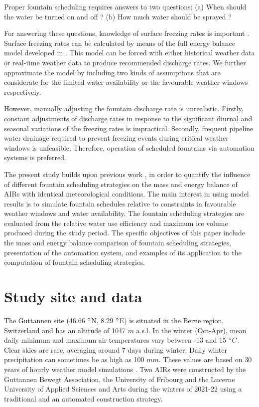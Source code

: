 \documentclass[tc, manuscript]{copernicus}
\begin{document}
Proper fountain scheduling requires answers to two questions: 
(a) When should the water be turned on and off ?
(b) How much water should be sprayed ? 

For answering these questions, knowledge of surface freezing rates is important . Surface freezing rates can be
calculated by means of the full energy balance model developed in
\cite{balasubramanianInfluenceMeteorologicalConditions2022}. This model can be forced with either historical
weather data or real-time weather data to produce recommended discharge rates. We further approximate the model
by including two kinds of assumptions that are considerate for the limited water availability or the favourable
weather windows respectively.

However, manually adjusting the fountain discharge rate is unrealistic. Firstly, constant adjustments of
discharge rates in response to the significant diurnal and seasonal variations of the freezing rates is
impractical. Secondly, frequent pipeline water drainage required to prevent freezing events during critical weather
windows is unfeasible. Therefore, operation of scheduled fountains via automation systems is preferred.

The present study builds upon previous work \citep{balasubramanianInfluenceMeteorologicalConditions2022}, in
order to quantify the influence of different fountain scheduling strategies on the mass and energy balance of
AIRs with identical meteorological conditions. The main interest in using model results is to simulate fountain
schedules relative to constraints in favourable weather windows and water availability. The fountain
scheduling strategies are evaluated from the relative water use efficiency and maximum ice volume produced
during the study period. The specific objectives of this paper include the mass and energy balance
comparison of fountain scheduling strategies, presentation of the automation system, and examples of its
application to the computation of fountain scheduling strategies.

\section{Study site and data}

The Guttannen site (46.66 $^{\circ}$N, 8.29 $^{\circ}$E) is situated in the Berne region, Switzerland and has an
altitude of 1047 $m$ a.s.l. In the winter (Oct-Apr), mean daily minimum and maximum air temperatures vary
between -13 and 15 $^{\circ} C$. Clear skies are rare, averaging around 7 days during winter. Daily winter
precipitation can sometimes be as high as 100 $mm$. These values are based on 30 years of hourly weather model
simulations \citep{guttannen}. Two AIRs were constructed by the Guttannen Bewegt Association, the University of
Fribourg and the Lucerne University of Applied Sciences and Arts during the winters of 2021-22 using a
traditional and an automated construction strategy.
\end{document}
